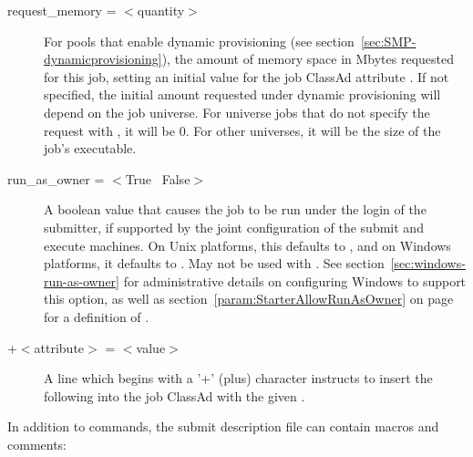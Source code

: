 \begin{description}
\item[request\_memory = $<$quantity$>$] For pools that enable
dynamic  provisioning
(see section~\ref{sec:SMP-dynamicprovisioning}),
the amount of memory space in Mbytes requested for this job,
setting an initial value for the job ClassAd attribute .
If not specified, the initial amount requested under dynamic 
provisioning will depend on the job universe.
For  universe jobs that do not specify the request with
, it will be 0.
For other universes,
it will be the size of the job's executable.


\item[run\_as\_owner = $<$True \Bar\ False$>$]
A boolean value that causes the job to be run under the login of 
the submitter,
if supported by the joint configuration of the submit and execute machines.
On Unix platforms, this defaults to ,
and on Windows platforms, it defaults to .
May not be used with .
See section~\ref{sec:windows-run-as-owner} for administrative details on
configuring Windows to support this option, as well as 
section~\ref{param:StarterAllowRunAsOwner}
on page~\pageref{param:StarterAllowRunAsOwner} for a definition of
.



\item[+$<$attribute$>$ = $<$value$>$] A line which begins with a '+'
(plus) character instructs  to insert the
following  into the job ClassAd with the given 
. 

\end{description} 


In addition to commands, the submit description file can contain macros
and comments:

